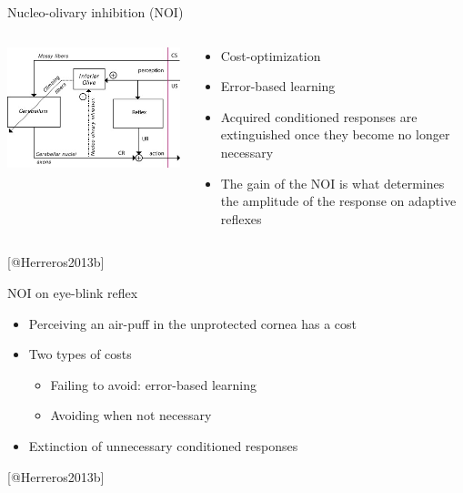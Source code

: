 \begin{frame}{Nucleo-olivary inhibition (NOI)}
	\begin{columns}[T]
		\begin{column}[T]{5cm}
			\includegraphics[]{images/noi.jpg}
		\end{column}
		\begin{column}[T]{5cm}
			\begin{itemize}
				\item Cost-optimization
				\item Error-based learning
				\item Acquired conditioned responses are extinguished once they become no longer necessary
				\item The gain of the NOI is what determines the amplitude of the response on adaptive reflexes
			\end{itemize}
		\end{column}
	\end{columns}
	[@Herreros2013b]
\end{frame}


\begin{frame}{NOI on eye-blink reflex}
	\begin{itemize}
		\item Perceiving an air-puff in the unprotected cornea has a cost
		\item Two types of costs
		\begin{itemize}
			\item Failing to avoid: error-based learning
			\item Avoiding when not necessary
		\end{itemize}
		\item Extinction of unnecessary conditioned responses
	\end{itemize}
	[@Herreros2013b]
\end{frame}


